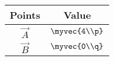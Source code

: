 \begin{tabular}{|c|c|}
\hline
\textbf{Points} & \textbf{Value} \\ \hline
$\vec{A}$ & $\myvec{4\\p}$ \\ \hline
$\vec{B}$ & $\myvec{0\\q}$ \\ \hline
\end{tabular}

